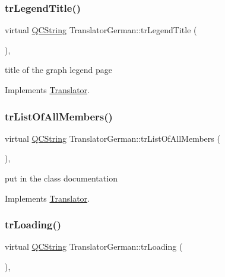 \subsubsection{\texorpdfstring{trLegendTitle()}{trLegendTitle()}}
{\footnotesize\ttfamily virtual \mbox{\hyperlink{class_q_c_string}{Q\+C\+String}} Translator\+German\+::tr\+Legend\+Title (\begin{DoxyParamCaption}{ }\end{DoxyParamCaption})\hspace{0.3cm}{\ttfamily [inline]}, {\ttfamily [virtual]}}

title of the graph legend page 

Implements \mbox{\hyperlink{class_translator}{Translator}}.

\mbox{\label{class_translator_german_a94ca2ee002ed1e794344f42c634a7a6f}} 
\subsubsection{\texorpdfstring{trListOfAllMembers()}{trListOfAllMembers()}}
{\footnotesize\ttfamily virtual \mbox{\hyperlink{class_q_c_string}{Q\+C\+String}} Translator\+German\+::tr\+List\+Of\+All\+Members (\begin{DoxyParamCaption}{ }\end{DoxyParamCaption})\hspace{0.3cm}{\ttfamily [inline]}, {\ttfamily [virtual]}}

put in the class documentation 

Implements \mbox{\hyperlink{class_translator}{Translator}}.

\mbox{\label{class_translator_german_aadbd25cbf2b49a19c92def2f69856af9}} 
\subsubsection{\texorpdfstring{trLoading()}{trLoading()}}
{\footnotesize\ttfamily virtual \mbox{\hyperlink{class_q_c_string}{Q\+C\+String}} Translator\+German\+::tr\+Loading (\begin{DoxyParamCaption}{ }\end{DoxyParamCaption})\hspace{0.3cm}{\ttfamily [inline]}, {\ttfamily [virtual]}}

